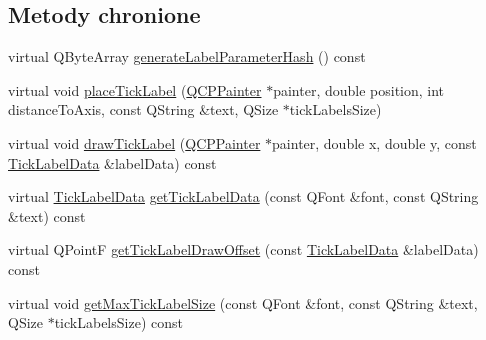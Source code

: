 \subsection*{Metody chronione}
\begin{DoxyCompactItemize}
\item 
virtual Q\+Byte\+Array \hyperlink{class_q_c_p_axis_painter_private_a91a023bbefe1c3bf330570c0b985de84}{generate\+Label\+Parameter\+Hash} () const 
\item 
virtual void \hyperlink{class_q_c_p_axis_painter_private_af8fe7350c19575bc33ca770f9b3a15fd}{place\+Tick\+Label} (\hyperlink{class_q_c_p_painter}{Q\+C\+P\+Painter} $\ast$painter, double position, int distance\+To\+Axis, const Q\+String \&text, Q\+Size $\ast$tick\+Labels\+Size)
\item 
virtual void \hyperlink{class_q_c_p_axis_painter_private_ad8f2f12cd35b8189e8bf96679e873933}{draw\+Tick\+Label} (\hyperlink{class_q_c_p_painter}{Q\+C\+P\+Painter} $\ast$painter, double x, double y, const \hyperlink{struct_q_c_p_axis_painter_private_1_1_tick_label_data}{Tick\+Label\+Data} \&label\+Data) const 
\item 
virtual \hyperlink{struct_q_c_p_axis_painter_private_1_1_tick_label_data}{Tick\+Label\+Data} \hyperlink{class_q_c_p_axis_painter_private_ad9f24fbcbf9d8c92b34d9d00b010e6a3}{get\+Tick\+Label\+Data} (const Q\+Font \&font, const Q\+String \&text) const 
\item 
virtual Q\+PointF \hyperlink{class_q_c_p_axis_painter_private_a6b02e6fd70cc65f726ca8cb3e6f16de4}{get\+Tick\+Label\+Draw\+Offset} (const \hyperlink{struct_q_c_p_axis_painter_private_1_1_tick_label_data}{Tick\+Label\+Data} \&label\+Data) const 
\item 
virtual void \hyperlink{class_q_c_p_axis_painter_private_a8a7c82303e272485621fde78a5b674f9}{get\+Max\+Tick\+Label\+Size} (const Q\+Font \&font, const Q\+String \&text, Q\+Size $\ast$tick\+Labels\+Size) const 
\end{DoxyCompactItemize}
